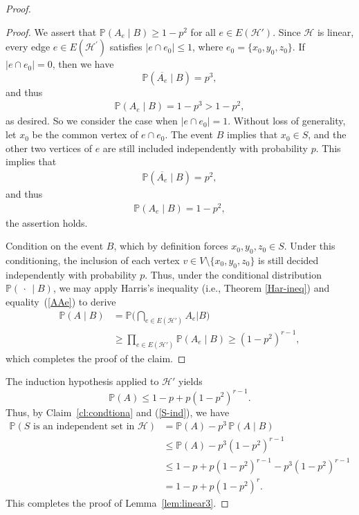 \documentclass[11pt,a4paper]{article}
\newcommand{\cH}{\mathcal{H}}
\newcommand{\bP}{\mathbb{P}}
\begin{document}
\begin{proof}
\begin{proof}
We assert that $\mathbb P(A_e\mid B)\ge 1-p^2$ for all $e\in E(\cH')$. Since $\cH$ is linear, every edge $e \in E\left(\cH^{\prime}\right)$ satisfies $\left|e \cap e_0\right| \leq 1$, where $e_0=\{x_0,y_0,z_0\}$.  If $|e \cap e_0|=0$,  then we have 
$$
\mathbb{P}(\overline{A_e} \mid B)=p^3,
$$
and thus 
\begin{align*}
\mathbb{P}\left(A_e \mid B\right)=1-p^3 > 1-p^2,
\end{align*}
as desired. So we consider the case when $\left|e \cap e_0\right|=1$. Without loss of  generality, let $x_0$ be the common vertex of $e\cap e_0$. The event $B$ implies that  $x_0 \in S$, and the other two vertices of $e$ are still included independently with probability $p$. This implies that
\begin{align*}
\mathbb{P}(\overline{A_e} \mid B)=p^2, 
\end{align*}
and thus 
\begin{align*}
 \mathbb{P}\left(A_e \mid B\right)=1-p^2,
 \end{align*}
the assertion holds.

Condition on the event $B$, which by definition forces $x_0,y_0,z_0\in S$.
Under this conditioning, the inclusion of each vertex $v\in V\setminus\{x_0,y_0,z_0\}$ is still decided
independently with probability $p$. 
Thus, under the conditional distribution $\bP(\,\cdot\,\mid B)$, we may apply Harris's inequality (i.e., Theorem \ref{Har-ineq}) and equality~(\ref{AAe}) to derive 
\begin{align*}
\mathbb P(A\mid B)&=\mathbb P\Big(\bigcap_{e\in E(\mathcal H')}A_e \Big| B\Big)\\
&\ge \prod_{e\in E(\mathcal H')}\mathbb P(A_e\mid B)
\ge (1-p^2)^{r-1},
\end{align*}
which completes the proof of the claim.
\end{proof}


The induction hypothesis applied to $\cH'$ yields
$$
\mathbb P(A)\le 1-p+p(1-p^2)^{r-1}.
$$
Thus, by Claim~\ref{cl:condtiona} and (\ref{S-ind}),  we have 
\begin{align*}
\mathbb P(S \text{ is an independent set  in } \cH)&=\mathbb P(A)-p^3\,\mathbb P(A\mid B)\\
&\le \mathbb P(A)-p^3(1-p^2)^{r-1}\\
&\le 1-p+p(1-p^2)^{r-1}-p^3(1-p^2)^{r-1}\\
&=1-p+p(1-p^2)^r.
\end{align*}
This completes the proof of Lemma~\ref{lem:linear3}.
\end{proof}
\end{document}

